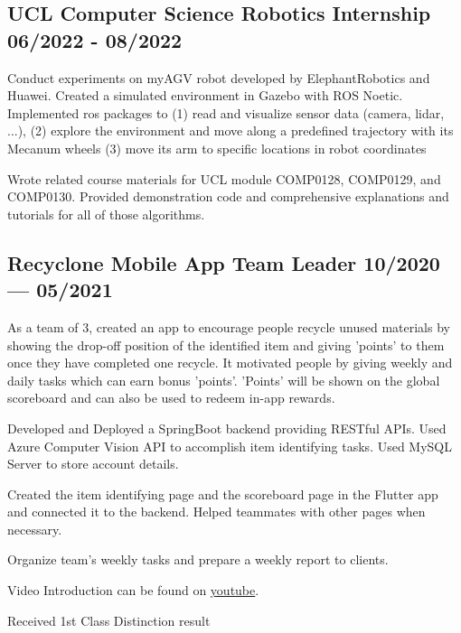 \subsection*{{
    UCL Computer Science Robotics Internship
    \hfill 06/2022 - 08/2022
}}
\begin{zitemize}
    \item   Conduct experiments on myAGV robot developed by ElephantRobotics and Huawei.
            Created a simulated environment in Gazebo with ROS Noetic. 
            Implemented ros packages to (1) read and visualize sensor data (camera, lidar, ...),
            (2) explore the environment and move along a predefined trajectory with its Mecanum wheels
            (3) move its arm to specific locations in robot coordinates
    \item   Wrote related course materials for UCL module COMP0128, COMP0129, and COMP0130.
            Provided demonstration code and comprehensive explanations and tutorials for all of those algorithms.
\end{zitemize}


\subsection{{
    Recyclone Mobile App Team Leader
    \hfill 10/2020 --- 05/2021
}}
\begin{zitemize}
    \item   As a team of 3, created an app to encourage people recycle unused materials by showing
            the drop-off position of the identified item and giving 'points' to them
            once they have completed one recycle. It motivated people by giving weekly and daily
            tasks which can earn bonus 'points'. 'Points' will be shown on the global scoreboard 
            and can also be used to redeem in-app rewards.  
    \item   Developed and Deployed a SpringBoot backend providing RESTful APIs.
            Used Azure Computer Vision API to accomplish item identifying tasks.
            Used MySQL Server to store account details. 
    \item   Created the item identifying page and the scoreboard page in the Flutter app and connected it
            to the backend. Helped teammates with other pages when necessary. 
    \item   Organize team's weekly tasks and prepare a weekly report to clients. 
    \item   Video Introduction can be found on \href{https://www.youtube.com/watch?v=gh0Uv4mf7cA&t=3s&ab_channel=timkhuang}{youtube}.
    \item   Received 1st Class Distinction result
\end{zitemize}


